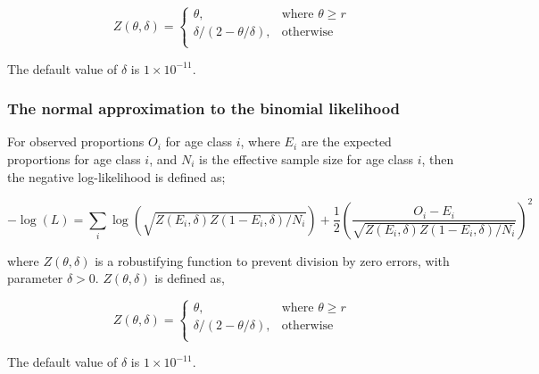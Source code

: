 {{{{\begin{equation}
   Z \left(\theta,\delta \right) = \begin{cases}
	  \theta, & \text{where $\theta \ge r$} \\
	  \delta/\left( 2-\theta/\delta \right), & \text{otherwise} \\  
  \end{cases}
\end{equation}

The default value of $\delta$ is $1 \times 10^{-11}$.

\subsubsection*{The normal approximation to the binomial likelihood}

For observed proportions $O_i$ for age class $i$, where $E_i$ are the expected proportions for age class $i$, and $N_i$ is the effective sample size for age class $i$, then the negative log-likelihood is defined as;  

\begin{equation}
  -\log \left(L \right)= \sum\limits_i \log \left( \sqrt{Z\left(E_i,\delta \right)Z\left(1-E_i,\delta\right)/N_i} \right)     + \frac{1}{2} \left( \frac{O_i-E_i}{\sqrt{Z\left(E_i,\delta\right)Z\left(1-E_i,\delta \right)/N_i}} \right)^2
\end{equation}

where $Z \left(\theta,\delta \right)$ is a robustifying function to prevent division by zero errors, with parameter $\delta>0$. $Z \left(\theta,\delta \right)$ is defined as,

\begin{equation}
   Z \left(\theta,\delta \right) = \begin{cases}
	  \theta, & \text{where $\theta \ge r$} \\
	  \delta/\left( 2-\theta/\delta \right), & \text{otherwise} \\  
  \end{cases}
\end{equation}

The default value of $\delta$ is $1 \times 10^{-11}$.

\subsection{}

}}}}
